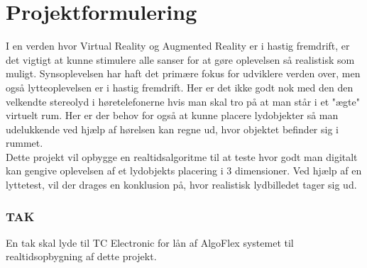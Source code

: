 \chapter{Projektformulering}

I en verden hvor Virtual Reality og Augmented Reality er i hastig fremdrift, er det vigtigt at kunne stimulere alle sanser for at gøre oplevelsen så realistisk som muligt. Synsoplevelsen har haft det primære fokus for udviklere verden over, men også lytteoplevelsen er i hastig fremdrift. Her er det ikke godt nok med den den velkendte stereolyd i høretelefonerne hvis man skal tro på at man står i et "ægte" virtuelt rum. Her er der behov for også at kunne placere lydobjekter så man udelukkende ved hjælp af hørelsen kan regne ud, hvor objektet befinder sig i rummet.\\ Dette projekt vil opbygge en realtidsalgoritme til at teste hvor godt man digitalt kan gengive oplevelsen af et lydobjekts placering i 3 dimensioner. Ved hjælp af en lyttetest, vil der drages en konklusion på, hvor realistisk lydbilledet tager sig ud.


\subsection{TAK}

En tak skal lyde til TC Electronic for lån af AlgoFlex systemet til realtidsopbygning af dette projekt.

